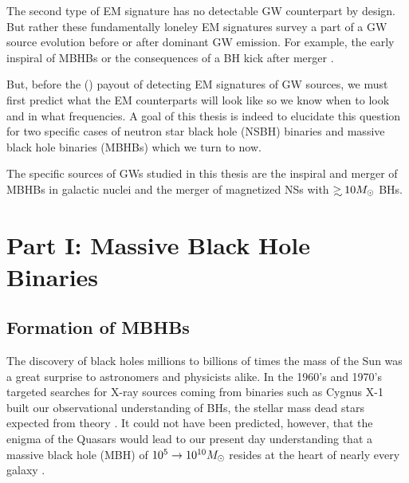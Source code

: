 The second type of EM signature has no detectable GW counterpart by design.
But rather these fundamentally loneley EM signatures survey a part of a GW source evolution before or after dominant GW emission. For example, the early inspiral of MBHBs \citep{Haiman looking for inspiralling MBHBs} or the consequences of a BH kick after merger \citep{BHkicks}.




But, before the () payout of detecting EM signatures of GW sources, we must first predict what the EM counterparts will look like so we know
when to look and in what frequencies. A goal of this thesis is indeed to
elucidate this question for two specific cases of neutron star black hole
(NSBH) binaries and massive black hole binaries (MBHBs) which we turn to now. 

 



The specific sources of GWs studied in this thesis are the inspiral and merger
of MBHBs in galactic nuclei and the merger of magnetized NSs with $\gsim 10
\Msun$ BHs.

\section{Part I: Massive Black Hole Binaries}
\subsection{Formation of MBHBs}
The discovery of black holes millions to billions of times the mass of the Sun was a great surprise to astronomers and physicists alike. In the 1960's and 1970's targeted searches for X-ray sources coming from binaries such as Cygnus X-1 built our observational understanding of BHs, the stellar mass dead stars expected from theory \citep{}. It could not have been predicted, however, that the enigma of the Quasars \citep[\emph{e.g.}][]{Saltpeter:1964, LyndenBell:1969} would lead to our present day understanding that a massive black hole (MBH) of $10^5 \rightarrow 10^{10} {M_{\odot}}$ resides at the heart of nearly every galaxy \citep{KR95, KHo2015, FerrareseFord:2005}. 

